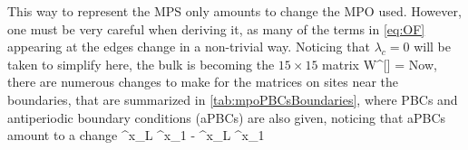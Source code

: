		This way to represent the MPS only amounts to change the MPO used. However, one must be very careful when deriving it, as many of the terms in \eqref{eq:OF} appearing at the edges change in a non-trivial way. Noticing that $\lambda_c=0$ will be taken to simplify here, the bulk is becoming the $15\times15$ matrix
		\be W^{[\ell]} =  \ee
		Now, there are numerous changes to make for the matrices on sites near the boundaries, that are summarized in \autoref{tab:mpoPBCsBoundaries}, where PBCs and antiperiodic boundary conditions (aPBCs) are also given, noticing that aPBCs amount to a change
		\be \sigma^x_L \sigma^x_1 \to - \sigma^x_L \sigma^x_1 \ee

